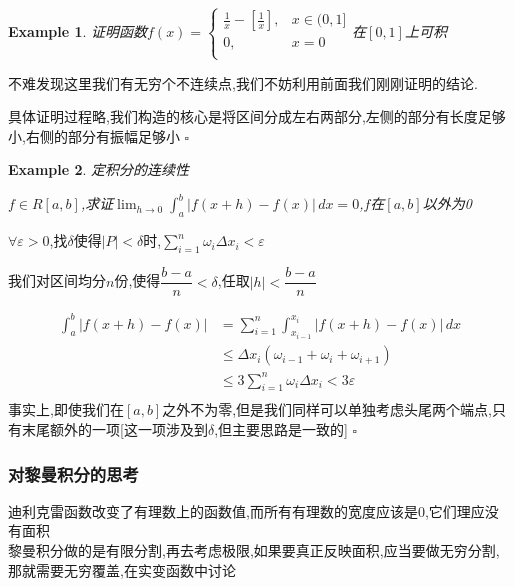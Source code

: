 \documentclass[11pt,hyperref,a4paper,UTF8]{ctexart}
\newtheorem{example}{Example}[subsection]
\newenvironment{cproof}{%
\heiti{证明}\kaishu
}{%
  \hfill $\square$
  \par\bigskip
}
\newcommand{\abs}[1]{\left|#1\right|}
\begin{document}
\begin{CJK}{UTF8}{gkai}
\begin{example}
  证明函数$f(x) = \begin{cases}
    \frac{1}{x} - [\frac{1}{x}],&x \in (0,1]\\
    0, &x = 0\\
  \end{cases}$在$[0,1]$上可积
\end{example}

\begin{cproof}
  不难发现这里我们有无穷个不连续点,我们不妨利用前面我们刚刚证明的结论.

  具体证明过程略,我们构造的核心是将区间分成左右两部分,左侧的部分有长度足够小,右侧的部分有振幅足够小
\end{cproof}

\begin{example}
  定积分的连续性

  $f\in R[a,b]$,求证$\lim_{h \to 0} \int_{a}^{b}\abs{f(x + h) - f(x)}\, dx = 0$,$f$在$[a,b]$以外为0
\end{example}

\begin{cproof}
  $\forall \varepsilon > 0$,找$\delta$使得$|P| < \delta$时,$\sum_{i = 1}^{n}\omega_i \Delta x_i < \varepsilon$

  我们对区间均分$n$份,使得$\dfrac{b - a}{n} < \delta$,任取$|h| < \dfrac{b - a}{n}$

  \[
  \begin{aligned}
    \int_{a}^{b}\abs{f(x + h) - f(x)} &= \sum_{i = 1}^{n} \int_{x_{i -1}}^{x_i}\abs{f(x + h) - f(x)}\, dx\\
    &\leq \Delta x_{i} (\omega_{i - 1} + \omega_{i} + \omega_{i + 1})\\
    &\leq 3 \sum_{i = 1}^{n} \omega_i \Delta x_i < 3 \varepsilon\\
  \end{aligned}  
  \]
  事实上,即使我们在$[a,b]$之外不为零,但是我们同样可以单独考虑头尾两个端点,只有末尾额外的一项[这一项涉及到$\delta$,但主要思路是一致的]
\end{cproof}

\subsubsection{对黎曼积分的思考}
迪利克雷函数改变了有理数上的函数值,而所有有理数的宽度应该是0,它们理应没有面积\\
黎曼积分做的是有限分割,再去考虑极限,如果要真正反映面积,应当要做无穷分割,那就需要无穷覆盖,在实变函数中讨论\\


\end{CJK}
\end{document}
